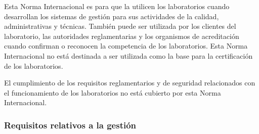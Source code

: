 \par \noindent
Esta Norma Internacional es para que la utilicen los laboratorios cuando desarrollan los sistemas de
gestión para sus actividades de la calidad, administrativas y técnicas. También puede ser utilizada por los clientes del laboratorio, las autoridades reglamentarias y los organismos de acreditación cuando confirman o reconocen la competencia de los laboratorios. Esta Norma Internacional no está destinada a ser utilizada
como la base para la certificación de los laboratorios.

\par \noindent
El cumplimiento de los requisitos reglamentarios y de seguridad relacionados con el funcionamiento de
los laboratorios no está cubierto por esta Norma Internacional.\cite{iso17025}

\subsubsection{Requisitos relativos a la gestión}

